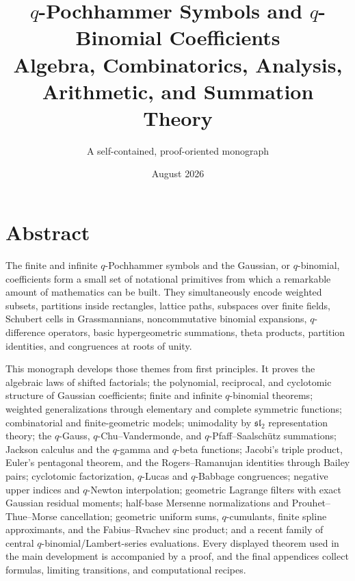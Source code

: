\documentclass[11pt,oneside,openany]{book}
\title{\Huge\bfseries $q$-Pochhammer Symbols and $q$-Binomial Coefficients\\[8pt]
\Large Algebra, Combinatorics, Analysis, Arithmetic, and Summation Theory}
\author{A self-contained, proof-oriented monograph}
\date{August 2026}
\theoremstyle{definition}
\theoremstyle{remark}
\begin{document}
\frontmatter
\hypersetup{pageanchor=false}
\maketitle
\hypersetup{pageanchor=true}

\chapter*{Abstract}
The finite and infinite $q$-Pochhammer symbols and the Gaussian, or $q$-binomial, coefficients form a small set of notational primitives from which a remarkable amount of mathematics can be built.  They simultaneously encode weighted subsets, partitions inside rectangles, lattice paths, subspaces over finite fields, Schubert cells in Grassmannians, noncommutative binomial expansions, $q$-difference operators, basic hypergeometric summations, theta products, partition identities, and congruences at roots of unity.

This monograph develops those themes from first principles.  It proves the algebraic laws of shifted factorials; the polynomial, reciprocal, and cyclotomic structure of Gaussian coefficients; finite and infinite $q$-binomial theorems; weighted generalizations through elementary and complete symmetric functions; combinatorial and finite-geometric models; unimodality by $\mathfrak{sl}_2$ representation theory; the $q$-Gauss, $q$-Chu--Vandermonde, and $q$-Pfaff--Saalsch\"utz summations; Jackson calculus and the $q$-gamma and $q$-beta functions; Jacobi's triple product, Euler's pentagonal theorem, and the Rogers--Ramanujan identities through Bailey pairs; cyclotomic factorization, $q$-Lucas and $q$-Babbage congruences; negative upper indices and $q$-Newton interpolation; geometric Lagrange filters with exact Gaussian residual moments; half-base Mersenne normalizations and Prouhet--Thue--Morse cancellation; geometric uniform sums, $q$-cumulants, finite spline approximants, and the Fabius--Rvachev sinc product; and a recent family of central $q$-binomial/Lambert-series evaluations.  Every displayed theorem used in the main development is accompanied by a proof, and the final appendices collect formulas, limiting transitions, and computational recipes.
\end{document}
